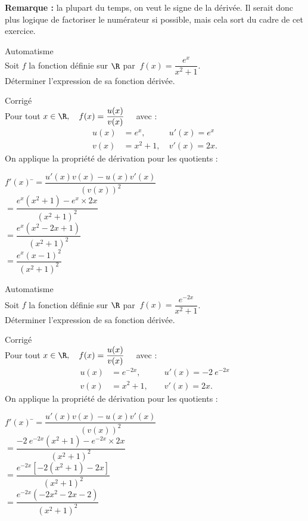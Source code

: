 \documentclass[a4paper,11pt,exos]{nsi} %
\newcounter{autNum}
\newcommand{\aut}[1]
{
	\addtocounter{autNum}{1}
	{\titlefont\color{UGLiBlue}\Large Automatisme\ \theautNum\ \normalsize{#1}}\smallskip	
}
\newcounter{corNum}
\newcommand{\cor}[1]
{
	\addtocounter{corNum}{1}
	{\titlefont\color{UGLiOrange}\Large Corrigé\ \thecorNum\ \normalsize{#1}}\smallskip	
}
\begin{document}
{\bfseries \color{black}Remarque :} la plupart du temps, on veut le signe de la dérivée. Il serait donc plus logique de factoriser le numérateur si possible, mais cela sort du cadre de cet exercice.\\

\aut{}\\%
Soit $f$ la fonction définie sur $\R$ par $\ f(x)=\dfrac{e^x}{x^2+1}$.\\[.5em]
Déterminer l'expression de sa fonction dérivée.\\

\cor{}\\
Pour tout $x\in  \R, \quad f(x)=\dfrac{u(x)}{v(x)}\quad$ avec :
\[\begin{aligned}u(x)&=e^x,\qquad &u'(x)=e^x\\ v(x)&=x^2+1,\ &v'(x)=2x.\end{aligned}\]
On applique la propriété de dérivation pour les quotients :
\begin{tabbing}
	$f'(x)$	\=$=\dfrac{u'(x)v(x)-u(x)v'(x)}{\left(v(x)\right)^2}$\\[.5em]
	\>	$=\dfrac{e^x\left(x^2+1\right)-e^x\times 2x}{\left(x^2+1\right)^2}$\\[.5em]
	\>	$=\dfrac{e^x\left(x^2-2x+1\right)}{\left(x^2+1\right)^2}$\\[.5em]
	\>	$=\dfrac{e^x\left(x-1\right)^2}{\left(x^2+1\right)^2}$
\end{tabbing}

\vspace*{.5cm}

\aut{}\\%
Soit $f$ la fonction définie sur $\R$ par $\ f(x)=\dfrac{e^{-2x}}{x^2+1}$.\\[.5em]
Déterminer l'expression de sa fonction dérivée.\\

\cor{}\\
Pour tout $x\in  \R, \quad f(x)=\dfrac{u(x)}{v(x)}\quad$ avec :
\[\begin{aligned}u(x)&=e^{-2x},\qquad &u'(x)=-2\ e^{-2x}\\ v(x)&=x^2+1, &v'(x)=2x.\end{aligned}\]
On applique la propriété de dérivation pour les quotients :
\begin{tabbing}
	$f'(x)$	\=$=\dfrac{u'(x)v(x)-u(x)v'(x)}{\left(v(x)\right)^2}$\\[.5em]
	\>	$=\dfrac{-2\ e^{-2x}\left(x^2+1\right)-e^{-2x}\times 2x}{\left(x^2+1\right)^2}$\\[.5em]
	\>	$=\dfrac{e^{-2x}\left[-2(x^2+1)-2x\right]}{\left(x^2+1\right)^2}$\\[.5em]
	\>	$=\dfrac{e^{-2x}\left(-2x^2-2x-2\right)}{\left(x^2+1\right)^2}$
\end{tabbing}
\end{document}
